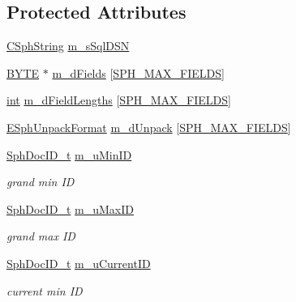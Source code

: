 \subsection*{Protected Attributes}
\begin{DoxyCompactItemize}
\item 
\hyperlink{structCSphString}{C\-Sph\-String} \hyperlink{structCSphSource__SQL_ae7deb5d2c5c32eae4c21d530e3cc029d}{m\-\_\-s\-Sql\-D\-S\-N}
\item 
\hyperlink{sphinxstd_8h_a4ae1dab0fb4b072a66584546209e7d58}{B\-Y\-T\-E} $\ast$ \hyperlink{structCSphSource__SQL_aa3bf67db9fa45af54e16d67253217b58}{m\-\_\-d\-Fields} \mbox{[}\hyperlink{sphinx_8h_ad5336c1a92b4f76b012a1a868a85b874}{S\-P\-H\-\_\-\-M\-A\-X\-\_\-\-F\-I\-E\-L\-D\-S}\mbox{]}
\item 
\hyperlink{sphinxexpr_8cpp_a4a26e8f9cb8b736e0c4cbf4d16de985e}{int} \hyperlink{structCSphSource__SQL_a31d8514d21d2d93c4feace87ba9b7b94}{m\-\_\-d\-Field\-Lengths} \mbox{[}\hyperlink{sphinx_8h_ad5336c1a92b4f76b012a1a868a85b874}{S\-P\-H\-\_\-\-M\-A\-X\-\_\-\-F\-I\-E\-L\-D\-S}\mbox{]}
\item 
\hyperlink{sphinx_8h_a4d4996a14f2199e251e4f55ac3d302f0}{E\-Sph\-Unpack\-Format} \hyperlink{structCSphSource__SQL_a48f68e7168dca54a98a9b519c6007246}{m\-\_\-d\-Unpack} \mbox{[}\hyperlink{sphinx_8h_ad5336c1a92b4f76b012a1a868a85b874}{S\-P\-H\-\_\-\-M\-A\-X\-\_\-\-F\-I\-E\-L\-D\-S}\mbox{]}
\item 
\hyperlink{sphinx_8h_a3176771631c12a9e4897272003e6b447}{Sph\-Doc\-I\-D\-\_\-t} \hyperlink{structCSphSource__SQL_a778a60151f224ab5cc7b3fb8cf1e36cc}{m\-\_\-u\-Min\-I\-D}
\begin{DoxyCompactList}\small\item\em grand min I\-D \end{DoxyCompactList}\item 
\hyperlink{sphinx_8h_a3176771631c12a9e4897272003e6b447}{Sph\-Doc\-I\-D\-\_\-t} \hyperlink{structCSphSource__SQL_aaeb3be54144f531d7606abd46719b657}{m\-\_\-u\-Max\-I\-D}
\begin{DoxyCompactList}\small\item\em grand max I\-D \end{DoxyCompactList}\item 
\hyperlink{sphinx_8h_a3176771631c12a9e4897272003e6b447}{Sph\-Doc\-I\-D\-\_\-t} \hyperlink{structCSphSource__SQL_aa02c355166552c4c0645daf68f3e566d}{m\-\_\-u\-Current\-I\-D}
\begin{DoxyCompactList}\small\item\em current min I\-D \end{DoxyCompactList}\item 

\end{DoxyCompactItemize}
